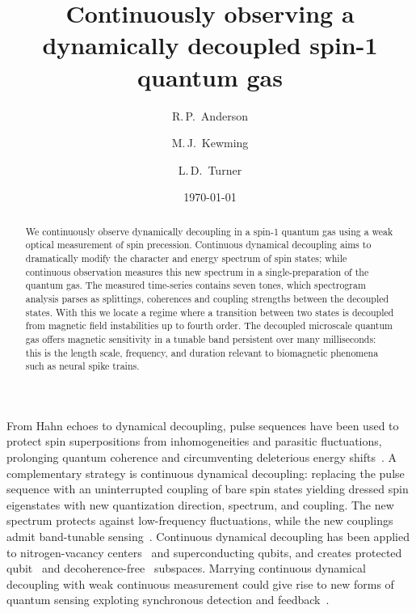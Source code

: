 \documentclass[aps,prl,reprint,superscriptaddress,floatfix]{revtex4-1}
\begin{document}
\title{Continuously observing a dynamically decoupled spin-1 quantum gas}

\author{R.\,P.~Anderson}
\author{M.\,J.~Kewming}
\author{L.\,D.~Turner}

\date{\today}

\begin{abstract}
We continuously observe dynamically decoupling in a spin-1 quantum gas using a weak optical measurement of spin precession.
Continuous dynamical decoupling aims to dramatically modify the character and energy spectrum of spin states; 
while continuous observation measures this new spectrum in a single-preparation of the quantum gas.
The measured time-series contains seven tones, which spectrogram analysis parses as splittings, coherences and coupling strengths between the decoupled states.
With this we locate a regime where a transition between two states is decoupled from magnetic field instabilities up to fourth order.
The decoupled microscale quantum gas offers magnetic sensitivity in a tunable band persistent over many milliseconds: this is the length scale, frequency, and duration relevant to biomagnetic phenomena such as neural spike trains.
\end{abstract}

\maketitle

From Hahn echoes to dynamical decoupling, pulse sequences have been used to protect spin superpositions from inhomogeneities and parasitic fluctuations, prolonging quantum coherence and circumventing deleterious energy shifts~\cite{biercuk_optimized_2009,lange_universal_2010,bluhm_dephasing_2011}.
A complementary strategy is continuous dynamical decoupling: replacing the pulse sequence with an uninterrupted coupling of bare spin states yielding dressed spin eigenstates with new quantization direction, spectrum, and coupling.
The new spectrum protects against low-frequency fluctuations, while the new couplings admit band-tunable sensing~\cite{fanchini_continuously_2007}.
Continuous dynamical decoupling has been applied to nitrogen-vacancy centers~\cite{hirose_continuous_2012,loretz_radio-frequency_2013,cai_robust_2012,*cai_long-lived_2012,golter_protecting_2014} and superconducting qubits, and creates protected qubit~\cite{aharon_general_2013} and decoherence-free~\cite{facchi_quantum_2002,*facchi_unification_2004} subspaces.
Marrying continuous dynamical decoupling with weak continuous measurement could give rise to new forms of quantum sensing exploting synchronous detection and feedback~\cite{vijay_stabilizing_2012}.
\end{document}
